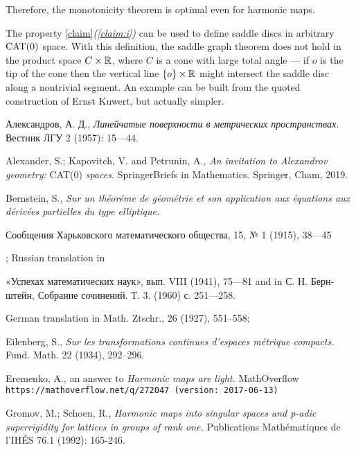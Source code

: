\documentclass{article}
\begin{document}
Therefore, the monotonicity theorem is optimal even for harmonic maps.

The property \ref{claim}\textit{(\ref{claim:i})} can be used to define saddle discs in arbitrary $\mathop{\rm CAT}\nolimits(0)$ space.
With this definition, the saddle graph theorem does not hold in the product space $C\times \mathbb{R}$, where $C$ is a cone with large total angle --- if $o$ is the tip of the cone then the vertical line $\{o\}\times\mathbb{R}$ might intersect the saddle disc along a nontrivial segment.
An example can be built from the quoted construction of Ernst Kuwert, but actually simpler.


\begin{thebibliography}{52}

 \begin{otherlanguage}{russian}
Александров, А. Д., 
\textit{Линейчатые поверхности в метрических пространствах.}
Вестник ЛГУ 2 (1957): 15---44.
\end{otherlanguage}

Alexander, S.; Kapovitch, V. and Petrunin, A.,
\textit{An invitation to Alexandrov geometry:} CAT(0) \textit{spaces.} SpringerBriefs in Mathematics. Springer, Cham, 2019.

Bernstein, S., \textit{Sur un th\'{e}or\'{e}me de g\'{e}om\'{e}trie et son application aux \'{e}quations aux d\'{e}riv\'{e}es partielles du type elliptique.}
\begin{otherlanguage}{russian}
Сообщения Харьковского математического общества, 15, № 1 (1915), 38---45
\end{otherlanguage};
Russian translation in 
\begin{otherlanguage}{russian}
«Успехах математических наук», вып. VIII (1941), 75---81
and in С. Н. Бернштейн, Собрание сочинений. Т. 3. (1960) с. 251---258.
\end{otherlanguage}
German translation in Math. Ztschr., 26 (1927), 551--558;

 Eilenberg, S.,
\textit{Sur les transformations continues d’espaces m\'{e}trique compacts.}
Fund. Math. 22 (1934), 292--296.

 Eremenko, A., 
an answer to \textit{Harmonic maps are light.} MathOverflow
\texttt{https://mathoverflow.net/q/272047 (version: 2017-06-13)}

 Gromov, M.; Schoen, R., 
\textit{Harmonic maps into singular spaces and p-adic superrigidity for lattices in groups of rank one.} 
Publications Mathématiques de l'IHÉS 76.1 (1992): 165-246.


\end{thebibliography}
\end{document}
